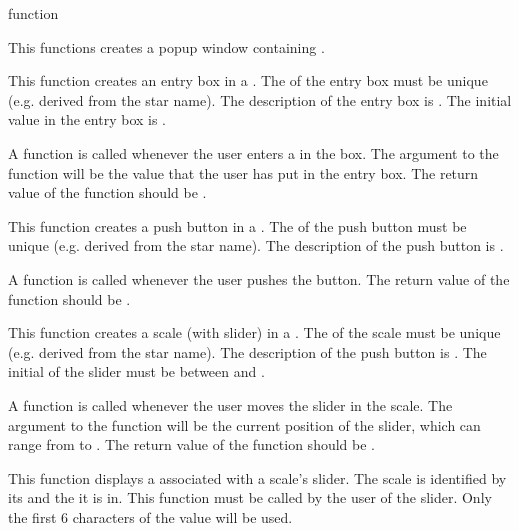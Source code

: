 \begin{sloppypar}
\begin{indexlist}{ function}

This functions creates a popup window containing .

This function creates an entry box in a .  The 
of the entry box must be unique (e.g. derived from the star name).  The
description of the entry box is .  The initial value in the
entry box is .

A  function is called whenever the user enters a
 in the box.  The argument to the  function
will be the value that the user has put in the entry box.  The return
value of the  function should be .

This function creates a push button in a .  The 
of the push button must be unique (e.g. derived from the star name).  The
description of the push button is .

A  function is called whenever the user pushes the
button.  The return value of the  function should be
.

This function creates a scale (with slider) in a .  The
 of the scale must be unique (e.g. derived from the star
name).  The description of the push button is .  The initial
 of the slider must be between  and .

A  function is called whenever the user moves the slider
in the scale.  The argument to the  function will be the
current position of the slider, which can range from  to
.  The return value of the  function should be
.

This function displays a  associated with a scale's slider.
The scale is identified by its  and the  it is in.
This function must be called by the user of the slider.
Only the first 6 characters of the value will be used.

\end{indexlist}
\end{sloppypar}

